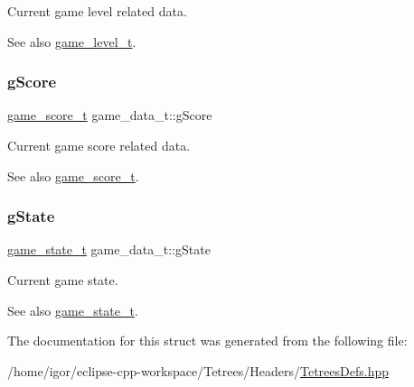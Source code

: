 Current game level related data. \begin{DoxySeeAlso}{See also}
\hyperlink{structgame__level__t}{game\+\_\+level\+\_\+t}. 
\end{DoxySeeAlso}
\mbox{\label{structgame__data__t_a70e04b66160685cc84bcdd30edb97e46}} 
\subsubsection{\texorpdfstring{g\+Score}{gScore}}
{\footnotesize\ttfamily \hyperlink{structgame__score__t}{game\+\_\+score\+\_\+t} game\+\_\+data\+\_\+t\+::g\+Score}

Current game score related data. \begin{DoxySeeAlso}{See also}
\hyperlink{structgame__score__t}{game\+\_\+score\+\_\+t}. 
\end{DoxySeeAlso}
\mbox{\label{structgame__data__t_a48253f7b6212e0ff99d5d5960b79476d}} 
\subsubsection{\texorpdfstring{g\+State}{gState}}
{\footnotesize\ttfamily \hyperlink{TetreesDefs_8hpp_aebae08b2e3a36f1452b33acaf1eaab40}{game\+\_\+state\+\_\+t} game\+\_\+data\+\_\+t\+::g\+State}

Current game state. \begin{DoxySeeAlso}{See also}
\hyperlink{TetreesDefs_8hpp_aebae08b2e3a36f1452b33acaf1eaab40}{game\+\_\+state\+\_\+t}. 
\end{DoxySeeAlso}


The documentation for this struct was generated from the following file\+:\begin{DoxyCompactItemize}
\item 
/home/igor/eclipse-\/cpp-\/workspace/\+Tetrees/\+Headers/\hyperlink{TetreesDefs_8hpp}{Tetrees\+Defs.\+hpp}\end{DoxyCompactItemize}
